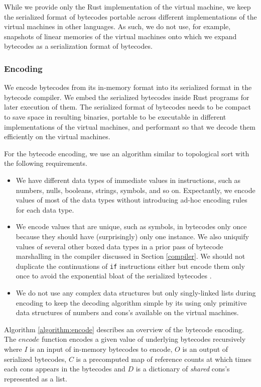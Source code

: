 \documentclass[sigplan, anonymous, review]{acmart}
\begin{document}
While we provide only the Rust implementation of the virtual machine,
we keep the serialized format of bytecodes portable across
different implementations of the virtual machines in other languages.
As such, we do not use, for example, snapshots of linear
memories of the virtual machines onto which we expand bytecodes as a
serialization format of bytecodes.

\subsubsection{Encoding} \label{encoding}

We encode bytecodes from its in-memory format into its serialized format in the
bytecode compiler.
We embed the serialized bytecodes inside Rust programs for later
execution of them.
The serialized format of bytecodes needs to be compact to save space in
resulting binaries, portable to be executable in different
implementations of the virtual machines, and performant so that we
decode them efficiently on the virtual machines.

For the bytecode encoding, we use an algorithm similar to topological
sort \cite{topologicalsort} with the following requirements.

\begin{itemize}
  \item We have different data types of immediate values in instructions,
    such as numbers, nulls, booleans, strings, symbols, and so on.
    Expectantly, we encode values of most of the data types without
    introducing ad-hoc encoding rules for each data type.
  \item We encode values that are unique, such as symbols, in
    bytecodes only once
    because they should have (surprisingly) only one instance.
    We also uniquify values of several other boxed data
    types in a prior pass of bytecode marshalling in the
    compiler discussed in Section \ref{compiler}.
    We should not duplicate the continuations of \texttt{if}
    instructions either but encode them only once to avoid the exponential bloat
    of the serialized bytecodes \cite{ribbit7kb2023}.
  \item We do not use any complex data structures but only singly-linked lists
    during encoding to keep the decoding algorithm simple by its using
    only primitive data structures of numbers and cons's available on
    the virtual machines.
\end{itemize}

Algorithm \ref{algorithm:encode} describes an overview of the bytecode
encoding.
The $encode$ function encodes a given value of
underlying bytecodes recursively where $I$ is an input of in-memory
bytecodes to encode,
$O$ is an output of serialized bytecodes, $C$ is a precomputed map of
reference counts
at which times each cons appears in the bytecodes and $D$ is a
dictionary of \textit{shared} cons's represented as a list.
\end{document}
